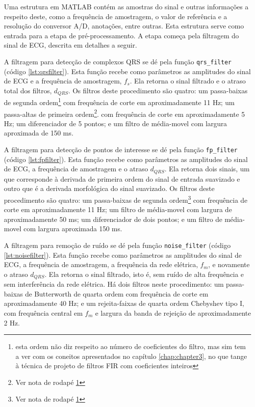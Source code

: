Uma estrutura em MATLAB contém as amostras do sinal e outras informações a respeito deste, como a frequência de amostragem, o valor de referência e a resolução do conversor A/D, anotações, entre outras. Esta estrutura serve como entrada para a etapa de pré-processamento. A etapa começa pela filtragem do sinal de ECG, descrita em detalhes a seguir.

A filtragem para detecção de complexos QRS se dé pela função \texttt{qrs\_filter} (código \ref{lst:qrsfilter}). Esta função recebe como parâmetros as amplitudes do sinal de ECG e a frequência de amostragem, $f_s$. Ela retorna o sinal filtrado e o atraso total dos filtros, $d_{QRS}$. Os filtros deste procedimento são quatro: um passa-baixas de segunda ordem\footnote{\label{fnt:note1}esta ordem não diz respeito ao número de coeficientes do filtro, mas sim tem a ver com os coneitos apresentados no capítulo \ref{chap:chapter3}, no que tange à técnica de projeto de filtros FIR com coeficientes inteiros} com frequência de corte em aproximadamente 11 Hz; um passa-altas de primeira ordem\footnote{Ver nota de rodapé \ref{fnt:note1}}. com frequência de corte em aproximadamente 5 Hz; um diferenciador de 5 pontos; e um filtro de média-movel com largura aproximada de 150 ms.

A filtragem para detecção de pontos de interesse se dé pela função \texttt{fp\_filter} (código \ref{lst:fpfilter}). Esta função recebe como parâmetros as amplitudes do sinal de ECG, a frequência de amostragem e o atraso $d_{QRS}$. Ela retorna dois sinais, um que corresponde à derivada de primeira ordem do sinal de entrada suavizado e outro que é a derivada morfológica \cite{Sun2002} do sinal suavizado. Os filtros deste procedimento são quatro: um passa-baixas de segunda ordem\footnote{Ver nota de rodapé \ref{fnt:note1}} com frequência de corte em aproximadamente 11 Hz; um filtro de média-movel com largura de aproximadamente 50 ms; um diferenciador de dois pontos; e um filtro de média-movel com largura aproximada 150 ms.

A filtragem para remoção de ruído se dé pela função \texttt{noise\_filter} (código \ref{lst:noisefilter}). Esta função recebe como parâmetros as amplitudes do sinal de ECG, a frequência de amostragem, a frequência da rede elétrica, $f_m$, e novamente o atraso $d_{QRS}$. Ela retorna o sinal filtrado, isto é, sem ruído de alta frequência e sem interferência da rede elétrica. Há dois filtros neste procedimento: um passa-baixas de Butterworth de quarta ordem com frequência de corte em aproximadamente 40 Hz; e um rejeita-faixas de quarta ordem Chebyshev tipo I, com frequência central em $f_m$ e largura da banda de rejeição de aproximadamente 2 Hz.

